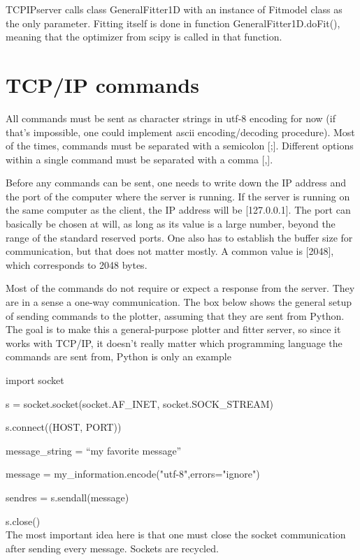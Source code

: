 \documentclass[11pt]{article} %
\begin{document}
{ TCPIPserver} calls class { GeneralFitter1D} with an instance of { Fitmodel} class as the only parameter. Fitting itself is done in function { GeneralFitter1D.doFit()}, meaning that the optimizer from { scipy} is called in that function.  

\section{TCP/IP commands}

All commands must be sent as character strings in utf-8 encoding for now (if that's impossible, one could implement ascii encoding/decoding procedure). Most of the times, commands must be separated with a semicolon [;]. Different options within a single command must be separated with a comma [,]. 

Before any commands can be sent, one needs to write down the IP address and the port of the computer where the server is running. If the server is running on the same computer as the client, the IP address will be [127.0.0.1]. The port can basically be chosen at will, as long as its value is a large number, beyond the range of the standard reserved ports. One also has to establish the buffer size for communication, but that does not matter mostly. A common value is [2048], which corresponds to 2048 bytes.

Most of the commands do not require or expect a response from the server. They are in a sense a one-way communication. The box below shows the general setup of sending commands to the plotter, assuming that they are sent from Python. The goal is to make this a general-purpose plotter and fitter server, so since it works with TCP/IP, it doesn't really matter which programming language the commands are sent from, Python is only an example 
\begin{tcolorbox}[title=General approach to sending commands]


{\selectfont import socket}

{\selectfont s = socket.socket(socket.AF\_INET, socket.SOCK\_STREAM)}

{\selectfont s.connect((HOST, PORT))}

{\selectfont message\_string = ``my favorite message''}

{\selectfont message = my\_information.encode("utf-8",errors="ignore")}

{\selectfont sendres = s.sendall(message)}

{\selectfont s.close()}
\\

The most important idea here is that one must close the socket communication after sending every message. Sockets are recycled. 
 
\end{tcolorbox}
\end{document}
